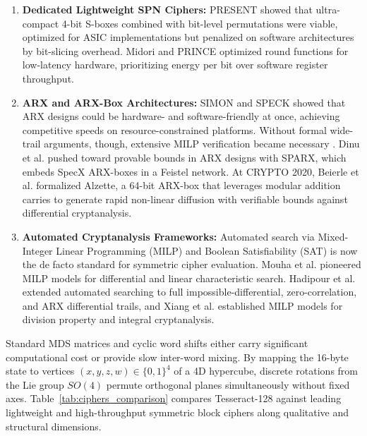 \documentclass[10pt,twocolumn]{article}
\begin{document}
\begin{enumerate}
    \item \textbf{Dedicated Lightweight SPN Ciphers:} PRESENT \cite{bogdanov2007present} showed that ultra-compact 4-bit S-boxes combined with bit-level permutations were viable, optimized for ASIC implementations but penalized on software architectures by bit-slicing overhead. Midori \cite{banik2015midori} and PRINCE \cite{borghoff2012prince} optimized round functions for low-latency hardware, prioritizing energy per bit over software register throughput.
    \item \textbf{ARX and ARX-Box Architectures:} SIMON and SPECK \cite{beaulieu2015simon} showed that ARX designs could be hardware- and software-friendly at once, achieving competitive speeds on resource-constrained platforms. Without formal wide-trail arguments, though, extensive MILP verification became necessary \cite{fu2016milp}. Dinu et al. \cite{dunkelman2016sparx} pushed toward provable bounds in ARX designs with SPARX, which embeds SpecX ARX-boxes in a Feistel network. At CRYPTO 2020, Beierle et al. \cite{beierle2020alzette} formalized Alzette, a 64-bit ARX-box that leverages modular addition carries to generate rapid non-linear diffusion with verifiable bounds against differential cryptanalysis.
    \item \textbf{Automated Cryptanalysis Frameworks:} Automated search via Mixed-Integer Linear Programming (MILP) and Boolean Satisfiability (SAT) is now the de facto standard for symmetric cipher evaluation. Mouha et al. \cite{mouha2011differential} pioneered MILP models for differential and linear characteristic search. Hadipour et al. \cite{hadipour2023impossible, hadipour2023milp} extended automated searching to full impossible-differential, zero-correlation, and ARX differential trails, and Xiang et al. \cite{xiang2016milp} established MILP models for division property and integral cryptanalysis.
\end{enumerate}

Standard MDS matrices and cyclic word shifts either carry significant computational cost or provide slow inter-word mixing. By mapping the 16-byte state to vertices $(x, y, z, w) \in \{0, 1\}^4$ of a 4D hypercube, discrete rotations from the Lie group $SO(4)$ permute orthogonal planes simultaneously without fixed axes. Table~\ref{tab:ciphers_comparison} compares Tesseract-128 against leading lightweight and high-throughput symmetric block ciphers along qualitative and structural dimensions.
\end{document}
